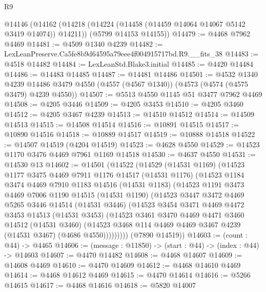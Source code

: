 \begin{lexlean}{R9}
\begin{coremodule}
  @14146
    (@14162
      (@14218 (@14224 (@14458 (@14459 @14064 @14067 @5142 @3419 @14074)) @14211))
      (@5799 @14153 @14155))
@14479 := @4468 @7962 @4469
@14481 := @4509 @1340 @4239
@14482 := LexLeanPreserve.Ca5fe8b9d64595a79eee4f004915717bd.R9.__fits_38
@14483 := @4518 @14482
@14484 := LexLeanStd.Blake3.initial
@14485 := @4420 @14484
@14486 := @14483 @14485
@14487 := @14481 @14486
@14501 := @4532
    @1340
    @4239
    @14486
    @3479
    @4550
    (@4557 (@4567 @1340))
    (@4573 (@4574 (@4575 @3479) @4239 @4550))
@14507 := @5513 @4550 @1145 @51 @3477 @7962 @4469
@14508 := @4205 @3446
@14509 := @4205 @3453
@14510 := @4205 @3460
@14512 := @4205 @3467 @4239
@14513 := @14510 @14512
@14514 := @14509 @14513
@14515 := @14508 @14514
@14516 := @10891 @14515
@14517 := @10890 @14516
@14518 := @10889 @14517
@14519 := @10888 @14518
@14522 := @14507 @14519 (@4204 @14519)
@14523 := @4628 @4550
@14529 := @14523 @1170 @3476 @4469 @7961 @1169 @14518
@14530 := @4637 @4550
@14531 := @14530 @13
@14602 := @14501
    (@14522
      (@14529
        (@14531 @1169)
        (@14523
          @1177
          @3475
          @4469
          @7911
          @1176
          @14517
          (@14531 @1176)
          (@14523
            @1184
            @3474
            @4469
            @7910
            @1183
            @14516
            (@14531 @1183)
            (@14523
              @1191
              @3473
              @4469
              @7006
              @1190
              @14515
              (@14531 @1190)
              (@14523
                @3447
                @3472
                @4469
                @5265
                @3446
                @14514
                (@14531 @3446)
                (@14523
                  @3454
                  @3471
                  @4469
                  @4472
                  @3453
                  @14513
                  (@14531 @3453)
                  (@14523
                    @3461
                    @3470
                    @4469
                    @4471
                    @3460
                    @14512
                    (@14531 @3460)
                    (@14523 @3468 @114 @4469 @4469 @3467 @4239 (@14531 @3467) (@4686 @4550)))))))))
      (@7890 @14519))
@14603 := (count : @44) -> @4465
@14606 := (message : @11850) -> (start : @44) -> (index : @44) -> @14603
@14607 := @4470 @14482
@14608 := @4468 @14607
@14609 := @14608 @4469
@14610 := @4470 @14609
@14612 := @4468 @14610 @4469
@14614 := @4468 @14612 @4469
@14615 := @4470 @14614
@14616 := @5266 @14615
@14617 := @4468 @14616
@14618 := @5820 @14007

\end{coremodule}
\end{lexlean}
